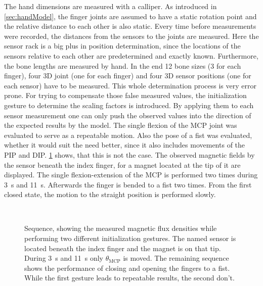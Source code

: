 The hand dimensions are measured with a calliper. As introduced in \ref{sec:handModel}, the finger joints are assumed to have a static rotation point and the relative distance to each other is also static. Every time before measurements were recorded, the distances from the sensors to the joints are measured. Here the sensor rack is a big plus in position determination, since the locations of the sensors relative to each other are predetermined and exactly known. Furthermore, the bone lengths are measured by hand. In the end 12 bone sizes (3 for each finger), four 3D joint (one for each finger) and four 3D sensor positions (one for each sensor) have to be measured. This whole determination process is very error prone. For trying to compensate those false measured values, the initialization gesture to determine the scaling factors is introduced. By applying them to each sensor measurement one can only push the observed values into the direction of the expected results by the model. The single flexion of the \ac{MCP} joint was evaluated to serve as a repeatable motion. Also the pose of a fist was evaluated, whether it would suit the need better, since it also includes movements of the \ac{PIP} and \ac{DIP}. \ref{fig:set1mag} shows, that this is not the case. The observed magnetic fields by the sensor beneath the index finger, for a magnet located at the tip of it are displayed. The single flexion-extension of the \ac{MCP} is performed two times during \SI{3}{\second} and \SI{11}{\second}. Afterwards the finger is bended to a fist two times. From the first closed state, the motion to the straight position is performed slowly.\\
\begin{figure}[!htb]
\centering
{}\\
\caption[Measured magnetic flux densities for various initialization gestures]
{Sequence, showing the measured magnetic flux densities while performing two different initialization gestures. The named sensor is located beneath the index finger and the magnet is on that tip. During \SI{3}{\second} and \SI{11}{\second} only $ \theta_{\mathrm{MCP}} $ is moved. The remaining sequence shows the performance of closing and opening the fingers to a fist. While the first gesture leads to repeatable results, the second don't.}
\label{fig:set1mag}
\end{figure}
\FloatBarrier
